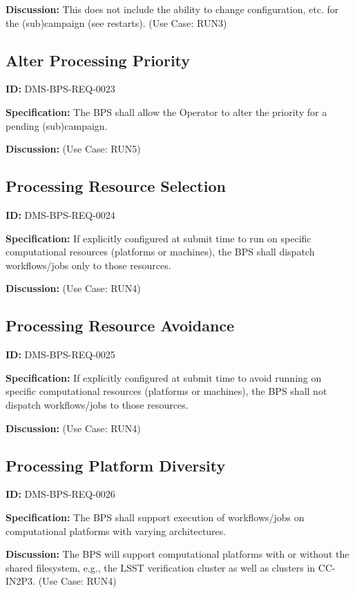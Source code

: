 \documentclass[SE,toc,lsstdraft]{lsstdoc}
\begin{document}
\textbf{Discussion:}
This does not include the ability to change configuration, etc. for the (sub)campaign (see restarts).  (Use Case: RUN3)

\subsection{Alter Processing Priority}

\label{DMS-BPS-REQ-0023}
\textbf{ID:} DMS-BPS-REQ-0023

\textbf{Specification:}
The BPS shall allow the Operator to alter the priority for a pending (sub)campaign.

\textbf{Discussion:}
(Use Case: RUN5)

\subsection{Processing Resource Selection}

\label{DMS-BPS-REQ-0024}
\textbf{ID:} DMS-BPS-REQ-0024

\textbf{Specification:}
If explicitly configured at submit time to run on specific computational resources (platforms or machines), the BPS shall dispatch workflows/jobs only to those resources.

\textbf{Discussion:}
(Use Case: RUN4)

\subsection{Processing Resource Avoidance}

\label{DMS-BPS-REQ-0025}
\textbf{ID:} DMS-BPS-REQ-0025

\textbf{Specification:}
If explicitly configured at submit time to avoid running on specific computational resources (platforms or machines), the BPS shall not dispatch workflows/jobs to those resources.

\textbf{Discussion:}
(Use Case: RUN4)

\subsection{Processing Platform Diversity}

\label{DMS-BPS-REQ-0026}
\textbf{ID:} DMS-BPS-REQ-0026

\textbf{Specification:}
The BPS shall support execution of workflows/jobs on computational platforms with varying architectures.

\textbf{Discussion:}
The BPS will support computational platforms with or without the shared filesystem, e.g., the LSST verification cluster as well as clusters in CC-IN2P3.  (Use Case: RUN4)
\end{document}
